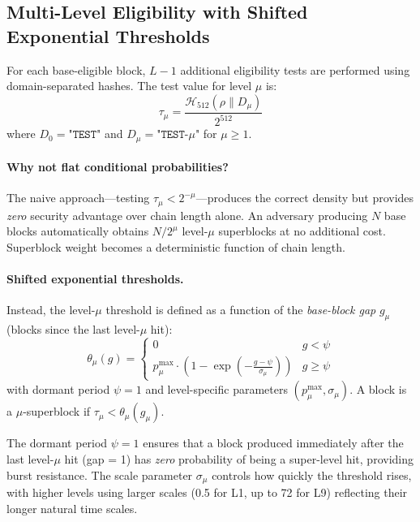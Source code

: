 \documentclass[11pt]{article}
\newcommand{\hash}{\mathcal{H}}
\begin{document}
\subsection{Multi-Level Eligibility with Shifted Exponential Thresholds}
\label{sec:levels}

For each base-eligible block, $L-1$ additional eligibility tests are performed using domain-separated hashes. The test value for level $\mu$ is:
\begin{equation}
    \tau_\mu = \frac{\hash_{512}(\rho \| D_\mu)}{2^{512}}
\end{equation}
where $D_0 = \texttt{"TEST"}$ and $D_\mu = \texttt{"TEST-}\mu\texttt{"}$ for $\mu \geq 1$.

\paragraph{Why not flat conditional probabilities?} The naive approach---testing $\tau_\mu < 2^{-\mu}$---produces the correct density but provides \emph{zero} security advantage over chain length alone. An adversary producing $N$ base blocks automatically obtains $N/2^\mu$ level-$\mu$ superblocks at no additional cost. Superblock weight becomes a deterministic function of chain length.

\paragraph{Shifted exponential thresholds.} Instead, the level-$\mu$ threshold is defined as a function of the \emph{base-block gap} $g_\mu$ (blocks since the last level-$\mu$ hit):
\begin{equation}
    \theta_\mu(g) = \begin{cases}
        0 & g < \psi \\
        p_\mu^{\max} \cdot \left(1 - \exp\left(-\frac{g - \psi}{\sigma_\mu}\right)\right) & g \geq \psi
    \end{cases}
    \label{eq:shifted_exp}
\end{equation}
with dormant period $\psi = 1$ and level-specific parameters $(p_\mu^{\max}, \sigma_\mu)$. A block is a $\mu$-superblock if $\tau_\mu < \theta_\mu(g_\mu)$.

The dormant period $\psi = 1$ ensures that a block produced immediately after the last level-$\mu$ hit (gap = 1) has \emph{zero} probability of being a super-level hit, providing burst resistance. The scale parameter $\sigma_\mu$ controls how quickly the threshold rises, with higher levels using larger scales (0.5 for L1, up to 72 for L9) reflecting their longer natural time scales.
\end{document}
